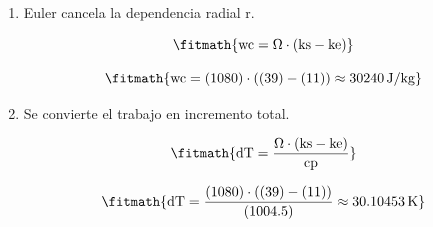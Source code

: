\begin{enumerate}

\item Euler cancela la dependencia radial r.

\[\fitmath{\mathrm{wc}=\Omega\cdot \left(\mathrm{ks}-\mathrm{ke}\right)}\]

\[\fitmath{\mathrm{wc}=(1080)\cdot \left((39)-(11)\right)\approx 30240\,\mathrm{J/kg}}\]

\item Se convierte el trabajo en incremento total.

\[\fitmath{\mathrm{dT}=\frac{\Omega\cdot \left(\mathrm{ks}-\mathrm{ke}\right)}{\mathrm{cp}}}\]

\[\fitmath{\mathrm{dT}=\frac{(1080)\cdot \left((39)-(11)\right)}{(1004.5)}\approx 30.10453\,\mathrm{K}}\]

\end{enumerate}
